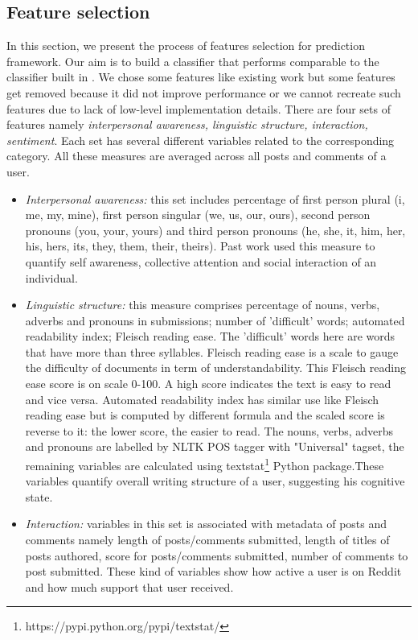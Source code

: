 \subsection{Feature selection}
In this section, we present the process of features selection for prediction framework. Our aim is to build a classifier that performs comparable to the classifier built in \cite{DeChoudhury2016}. We chose some features like existing work but some features get removed because it did not improve performance or we cannot recreate such features due to lack of low-level implementation details. There are four sets of features namely \textit{interpersonal awareness, linguistic structure, interaction, sentiment}. Each set has several different variables related to the corresponding category. All these measures are averaged across all posts and comments of a user.
\begin{itemize}
\item \textit{Interpersonal awareness:} this set includes percentage of first person plural (i, me, my, mine), first person singular (we, us, our, ours), second person pronouns (you, your, yours) and third person pronouns (he, she, it, him, her, his, hers, its, they, them, their, theirs). Past work \cite{DeChoudhury2013} used this measure to quantify self awareness, collective attention and social interaction of an individual.
\item \textit{Linguistic structure:} this measure comprises percentage of nouns, verbs, adverbs and pronouns in submissions; number of 'difficult' words; automated readability index; Fleisch reading ease. The 'difficult' words here are words that have more than three syllables. Fleisch reading ease is a scale to gauge the difficulty of documents in term of understandability. This Fleisch reading ease score is on scale 0-100. A high score indicates the text is easy to read and vice versa. Automated readability index has similar use like Fleisch reading ease but is computed by different formula and the scaled score is reverse to it: the lower score, the easier to read. The nouns, verbs, adverbs and pronouns are labelled by NLTK POS tagger with "Universal" tagset, the remaining variables are calculated using textstat\footnote{https://pypi.python.org/pypi/textstat/} Python package.These variables quantify overall writing structure of a user, suggesting his cognitive state.
\item \textit{Interaction:} variables in this set is associated with metadata of posts and comments namely length of posts/comments submitted, length of titles of posts authored, score for posts/comments submitted, number of comments to post submitted. These kind of variables show how active a user is on Reddit and how much support that user received.

\end{itemize}
